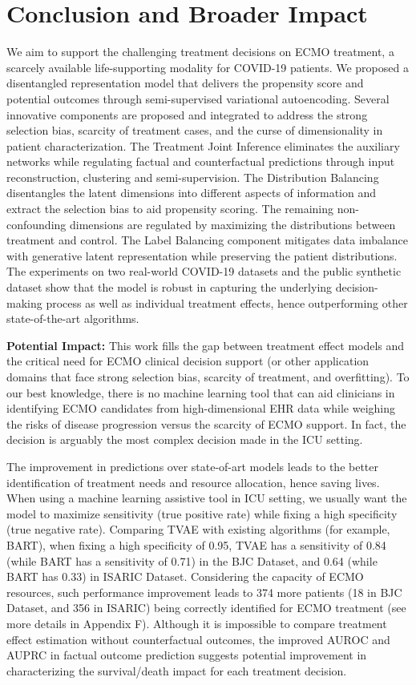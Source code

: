 \section{Conclusion and Broader Impact}
We aim to support the challenging treatment decisions on ECMO treatment, a scarcely available life-supporting modality for COVID-19 patients. We proposed a disentangled representation model that delivers the propensity score and potential outcomes through semi-supervised variational autoencoding. Several innovative components are proposed and integrated to address the strong selection bias, scarcity of treatment cases, and the curse of dimensionality in patient characterization. The Treatment Joint Inference eliminates the auxiliary networks while regulating factual and counterfactual predictions through input reconstruction, clustering and semi-supervision. The Distribution Balancing disentangles the latent dimensions into different aspects of information and extract the selection bias to aid propensity scoring. The remaining non-confounding dimensions are regulated by maximizing the distributions between treatment and control. The Label Balancing component mitigates data imbalance with generative latent representation while preserving the patient distributions. The experiments on two real-world COVID-19 datasets and the public synthetic dataset show that the model is robust in capturing the underlying decision-making process as well as individual treatment effects, hence outperforming other state-of-the-art algorithms.

\textbf{Potential Impact:}
This work fills the gap between treatment effect models and the critical need for ECMO clinical decision support (or other application domains that face strong selection bias, scarcity of treatment, and overfitting). To our best knowledge, there is no machine learning tool that can aid clinicians in identifying ECMO candidates from high-dimensional EHR data while weighing the risks of disease progression versus the scarcity of ECMO support. 
In fact, the decision is arguably the most complex decision made in the ICU setting. 

The improvement in predictions over state-of-art models leads to the better identification of treatment needs and resource allocation, hence saving lives. When using a machine learning assistive tool in ICU setting, we usually want the model to maximize sensitivity (true positive rate) while fixing a high specificity (true negative rate). Comparing TVAE with existing algorithms (for example, BART), when fixing a high specificity of 0.95, TVAE has a sensitivity of 0.84 (while BART has a sensitivity of 0.71) in the BJC Dataset, and 0.64 (while BART has 0.33) in ISARIC Dataset. Considering the capacity of ECMO resources, such performance improvement leads to 374 more patients (18 in BJC Dataset, and 356 in ISARIC) being correctly identified for ECMO treatment (see more details in Appendix F). Although it is impossible to compare treatment effect estimation without counterfactual outcomes, the improved AUROC and AUPRC in factual outcome prediction suggests potential improvement in characterizing the survival/death impact for each treatment decision.  

